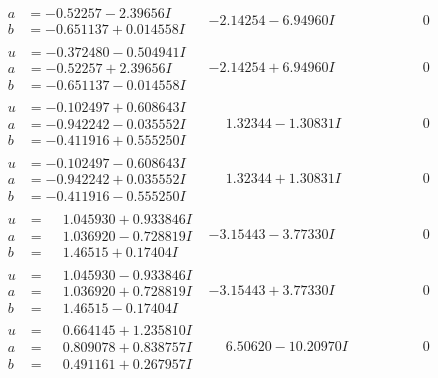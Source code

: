\documentclass[1p]{elsarticle_modified}
\theoremstyle{definition}
\begin{document}
$$\begin{array}{c|c|c}
\begin{aligned}
a &= -0.52257 - 2.39656 I \\
b &= -0.651137 + 0.014558 I\end{aligned}
 & -2.14254 - 6.94960 I & \phantom{-0.000000 } 0 \\ \hline\begin{aligned}
u &= -0.372480 - 0.504941 I \\
a &= -0.52257 + 2.39656 I \\
b &= -0.651137 - 0.014558 I\end{aligned}
 & -2.14254 + 6.94960 I & \phantom{-0.000000 } 0 \\ \hline\begin{aligned}
u &= -0.102497 + 0.608643 I \\
a &= -0.942242 - 0.035552 I \\
b &= -0.411916 + 0.555250 I\end{aligned}
 & \phantom{-}1.32344 - 1.30831 I & \phantom{-0.000000 } 0 \\ \hline\begin{aligned}
u &= -0.102497 - 0.608643 I \\
a &= -0.942242 + 0.035552 I \\
b &= -0.411916 - 0.555250 I\end{aligned}
 & \phantom{-}1.32344 + 1.30831 I & \phantom{-0.000000 } 0 \\ \hline\begin{aligned}
u &= \phantom{-}1.045930 + 0.933846 I \\
a &= \phantom{-}1.036920 - 0.728819 I \\
b &= \phantom{-}1.46515 + 0.17404 I\end{aligned}
 & -3.15443 - 3.77330 I & \phantom{-0.000000 } 0 \\ \hline\begin{aligned}
u &= \phantom{-}1.045930 - 0.933846 I \\
a &= \phantom{-}1.036920 + 0.728819 I \\
b &= \phantom{-}1.46515 - 0.17404 I\end{aligned}
 & -3.15443 + 3.77330 I & \phantom{-0.000000 } 0 \\ \hline\begin{aligned}
u &= \phantom{-}0.664145 + 1.235810 I \\
a &= \phantom{-}0.809078 + 0.838757 I \\
b &= \phantom{-}0.491161 + 0.267957 I\end{aligned}
 & \phantom{-}6.50620 - 10.20970 I & \phantom{-0.000000 } 0 \\ \hline\begin{aligned}

\end{aligned}
\end{array}$$
\end{document}
